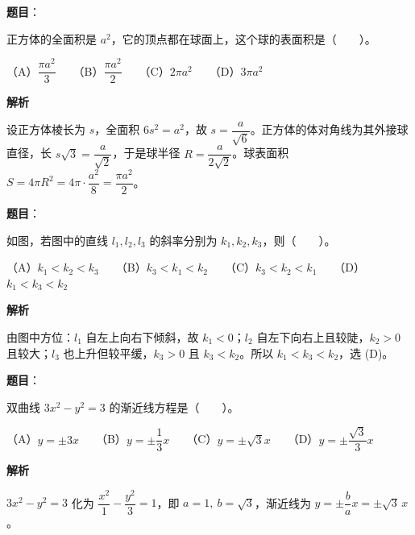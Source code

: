 \begin{answer}

\textbf{题目}：

正方体的全面积是 $a^2$，它的顶点都在球面上，这个球的表面积是\mbox{（　　）}。

（A）$\dfrac{\pi a^2}{3}$　　（B）$\dfrac{\pi a^2}{2}$　　（C）$2\pi a^2$　　（D）$3\pi a^2$

\textbf{解析}

设正方体棱长为 $s$，全面积 $6s^2=a^2$，故 $s=\dfrac{a}{\sqrt6}$。正方体的体对角线为其外接球直径，长 $s\sqrt3=\dfrac{a}{\sqrt2}$，于是球半径 $R=\dfrac{a}{2\sqrt2}$。球表面积 $S=4\pi R^2=4\pi\cdot\dfrac{a^2}{8}=\dfrac{\pi a^2}{2}$。


\end{answer}
\begin{answer}

\textbf{题目}：

如图，若图中的直线 $l_1,l_2,l_3$ 的斜率分别为 $k_1,k_2,k_3$，则\mbox{（　　）}。
\nopagebreak[4]
\begin{center}\end{center}
\nopagebreak[4]
（A）$k_1<k_2<k_3$　　（B）$k_3<k_1<k_2$　　（C）$k_3<k_2<k_1$　　（D）$k_1<k_3<k_2$

\textbf{解析}

由图中方位：$l_1$ 自左上向右下倾斜，故 $k_1<0$；$l_2$ 自左下向右上且较陡，$k_2>0$ 且较大；$l_3$ 也上升但较平缓，$k_3>0$ 且 $k_3<k_2$。所以 $k_1<k_3<k_2$，选 (D)。


\end{answer}
\begin{answer}

\textbf{题目}：

双曲线 $3x^2-y^2=3$ 的渐近线方程是\mbox{（　　）}。

（A）$y=\pm3x$　　（B）$y=\pm\dfrac13x$　　（C）$y=\pm\sqrt3x$　　（D）$y=\pm\dfrac{\sqrt3}{3}x$

\textbf{解析}

$3x^2-y^2=3$ 化为 $\dfrac{x^2}{1}-\dfrac{y^2}{3}=1$，即 $a=1,\ b=\sqrt3$，渐近线为 $y=\pm\dfrac{b}{a}x=\pm\sqrt3\,x$。


\end{answer}
